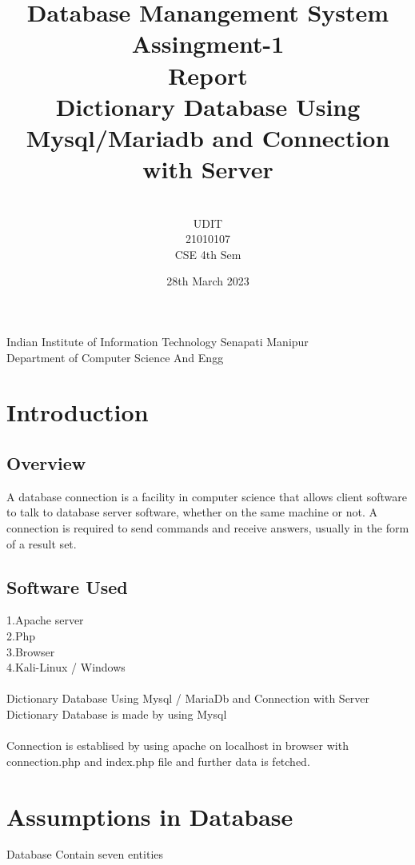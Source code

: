 \documentclass[13pt]{article}
\title{Database Manangement System\\Assingment-1\\Report\vspace{2cm}\\Dictionary Database Using Mysql/Mariadb and Connection with Server}
\author{\vspace{5cm}\\UDIT\\21010107\\CSE 4th Sem}
\date{28th March 2023}
\begin{document}
\maketitle  
\begin{center}
\large
\vfill
\large Indian Institute of Information Technology Senapati Manipur\\Department of Computer Science And Engg \end{center}
\pagebreak
\section{Introduction}
\vspace{1cm}
\subsection{Overview}

A database connection is a facility in computer science that allows client software to talk to database server software, whether on the same machine or not. A connection is required to send commands and receive answers, usually in the form of a result set.

\vspace{1cm}
\subsection{Software Used}
1.Apache server\\
2.Php\\
3.Browser\\
4.Kali-Linux / Windows\\
\vspace{0.5cm}\\
Dictionary Database Using Mysql / MariaDb and Connection with Server
Dictionary Database is made by using Mysql \\
\vspace{0.5cm}\\
Connection is establised by using apache on localhost in browser with connection.php and index.php file and further data is fetched.



\section{Assumptions in Database}

Database Contain seven entities 
\vspace{0.3cm}\\
\end{document}
